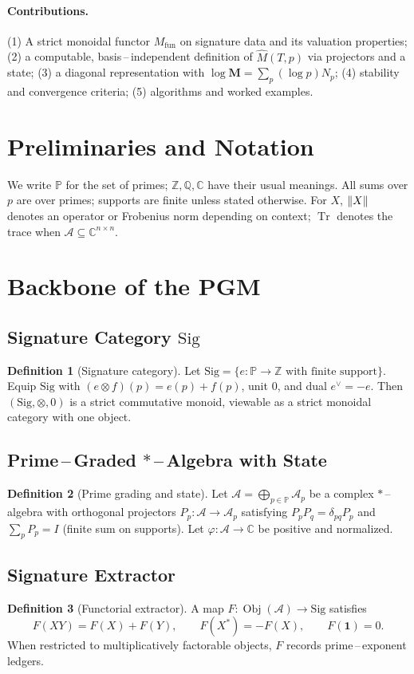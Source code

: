 \documentclass[11pt]{article}
\theoremstyle{definition}
\newtheorem{definition}{Definition}[section]
\theoremstyle{plain}
\theoremstyle{remark}
\newcommand{\Sig}{\mathrm{Sig}}
\newcommand{\A}{\mathcal{A}}
\newcommand{\Pbb}{\mathbb{P}}
\newcommand{\Qbb}{\mathbb{Q}}
\newcommand{\Zbb}{\mathbb{Z}}
\newcommand{\Cbb}{\mathbb{C}}
\newcommand{\Mfun}{M_{\mathrm{fun}}}
\newcommand{\Mhat}{\widehat{M}}
\DeclareMathOperator{\Tr}{Tr}
\DeclarePairedDelimiter{\norm}{\lVert}{\rVert}
\begin{document}
\paragraph{Contributions.} (1) A strict monoidal functor $\Mfun$ on signature data and its valuation properties; (2) a computable, basis\,–\,independent definition of $\Mhat(T,p)$ via projectors and a state; (3) a diagonal representation with $\log \mathbf M=\sum_p (\log p)N_p$; (4) stability and convergence criteria; (5) algorithms and worked examples.

\section{Preliminaries and Notation}
We write $\Pbb$ for the set of primes; $\Zbb,\Qbb,\Cbb$ have their usual meanings. All sums over $p$ are over primes; supports are finite unless stated otherwise. For $X$, $\norm{X}$ denotes an operator or Frobenius norm depending on context; $\Tr$ denotes the trace when $\A\subseteq \Cbb^{n\times n}$.

\section{Backbone of the PGM}
\subsection{Signature Category $\Sig$}
\begin{definition}[Signature category]
Let $\Sig=\{e:\Pbb\to\Zbb\text{ with finite support}\}$. Equip $\Sig$ with $(e\otimes f)(p)=e(p)+f(p)$, unit $0$, and dual $e^{\vee}=-e$. Then $(\Sig,\otimes,0)$ is a strict commutative monoid, viewable as a strict monoidal category with one object.
\end{definition}

\subsection{Prime\,–\,Graded $*$\,–\,Algebra with State}
\begin{definition}[Prime grading and state]
Let $\A=\bigoplus_{p\in\Pbb}\A_p$ be a complex $*$\,–\,algebra with orthogonal projectors $P_p:\A\to\A_p$ satisfying $P_pP_q=\delta_{pq}P_p$ and $\sum_p P_p=I$ (finite sum on supports). Let $\varphi: \A\to\Cbb$ be positive and normalized.
\end{definition}

\subsection{Signature Extractor}
\begin{definition}[Functorial extractor]\label{def:extractor}
A map $F:\operatorname{Obj}(\A)\to\Sig$ satisfies
\begin{equation}\label{eq:Faxioms}
F(XY)=F(X)+F(Y),\qquad F(X^{*})=-F(X),\qquad F(\mathbf 1)=0.
\end{equation}
When restricted to multiplicatively factorable objects, $F$ records prime\,–\,exponent ledgers.
\end{definition}
\end{document}
